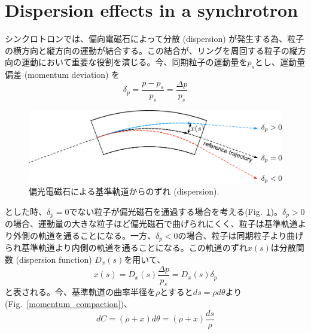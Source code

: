 \documentclass[10pt,a4paper]{jlreq}
\begin{document}
\section{Dispersion effects in a synchrotron}
シンクロトロンでは、偏向電磁石によって分散 (dispersion) が発生する為、粒子の横方向と縦方向の運動が結合する。この結合が、リングを周回する粒子の縦方向の運動において重要な役割を演じる。今、同期粒子の運動量を$p_s$とし、運動量偏差 (momentum deviation) を
%
\begin{equation}
  \delta_p = \frac{p-p_s}{p_s}=\frac{\Delta p}{p_s}
\end{equation}
%
\begin{figure}[hbt]
  \begin{center}
    \includegraphics[width=15cm,clip]{figs/dispersion.pdf}
    \caption{偏光電磁石による基準軌道からのずれ (dispersion).}
    \label{dispersion}
  \end{center}
\end{figure}
%
とした時、$\delta_p = 0$でない粒子が偏光磁石を通過する場合を考える(Fig.~\ref{dispersion})。$\delta_p >0$ の場合、運動量の大きな粒子ほど偏光磁石で曲げられにくく、粒子は基準軌道より外側の軌道を通ることになる。一方、$\delta_p<0$の場合、粒子は同期粒子より曲げられ基準軌道より内側の軌道を通ることになる。この軌道のずれ$x(s)$は分散関数 (dispersion function) $D_x(s)$を用いて、
%
\begin{equation}
  x(s) = D_x(s)\frac{\Delta p}{p_s} = D_x(s)\delta_p 
\end{equation}
%
と表される。今、基準軌道の曲率半径を$\rho$とすると$ds = \rho d\theta$より (Fig.~\ref{momentum_compaction})、
%
\begin{equation}
  dC = (\rho + x) d\theta = (\rho + x) \frac{ds}{\rho}
\end{equation}
%
\end{document}
